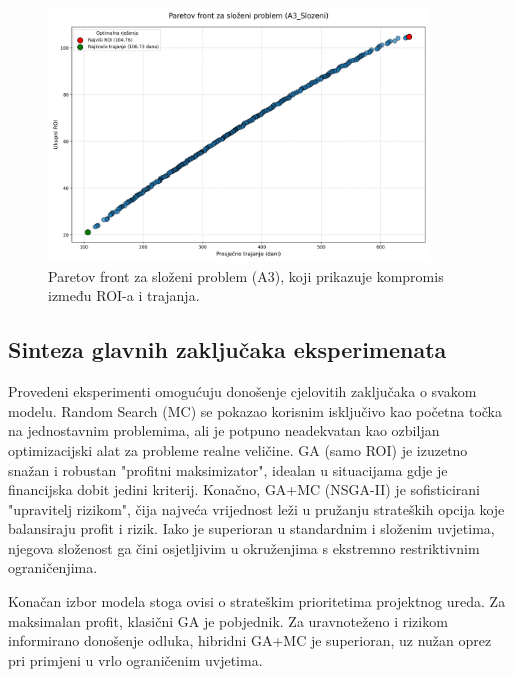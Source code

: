 \begin{figure}[H]
    \centering
    \includegraphics[width=0.9\textwidth]{slike/grafikoni_final/D_pareto_front_scatter.png}
    \caption{Paretov front za složeni problem (A3), koji prikazuje kompromis između ROI-a i trajanja.}
    \label{fig:pareto_front}
\end{figure}

\subsection{Sinteza glavnih zaključaka eksperimenata}
Provedeni eksperimenti omogućuju donošenje cjelovitih zaključaka o svakom modelu. Random Search (MC) se pokazao korisnim isključivo kao početna točka na jednostavnim problemima, ali je potpuno neadekvatan kao ozbiljan optimizacijski alat za probleme realne veličine. GA (samo ROI) je izuzetno snažan i robustan "profitni maksimizator", idealan u situacijama gdje je financijska dobit jedini kriterij. Konačno, GA+MC (NSGA-II) je sofisticirani "upravitelj rizikom", čija najveća vrijednost leži u pružanju strateških opcija koje balansiraju profit i rizik. Iako je superioran u standardnim i složenim uvjetima, njegova složenost ga čini osjetljivim u okruženjima s ekstremno restriktivnim ograničenjima.

Konačan izbor modela stoga ovisi o strateškim prioritetima projektnog ureda. Za maksimalan profit, klasični GA je pobjednik. Za uravnoteženo i rizikom informirano donošenje odluka, hibridni GA+MC je superioran, uz nužan oprez pri primjeni u vrlo ograničenim uvjetima.
